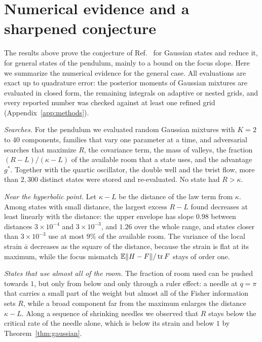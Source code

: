 \section{Numerical evidence and a sharpened conjecture}
\label{sec:evidence}

The results above prove the conjecture of Ref.~\cite{namba2026arrow} for Gaussian states and reduce it, for general states of the pendulum, mainly to a bound on the focus slope. Here we summarize the numerical evidence for the general case. All evaluations are exact up to quadrature error: the posterior moments of Gaussian mixtures are evaluated in closed form, the remaining integrals on adaptive or nested grids, and every reported number was checked against at least one refined grid (Appendix~\ref{app:methods}).

\emph{Searches.} For the pendulum we evaluated random Gaussian mixtures with $K = 2$ to $40$ components, families that vary one parameter at a time, and adversarial searches that maximize $R$, the covariance term, the mass of valleys, the fraction $(R - L)/(\kappa - L)$ of the available room that a state uses, and the advantage $g^*$. Together with the quartic oscillator, the double well and the twist flow, more than $2{,}300$ distinct states were stored and re-evaluated. No state had $R > \kappa$.

\emph{Near the hyperbolic point.} Let $\kappa - L$ be the distance of the law term from $\kappa$. Among states with small distance, the largest excess $R - L$ found decreases at least linearly with the distance: the upper envelope has slope $0.98$ between distances $3\times10^{-4}$ and $3\times10^{-3}$, and $1.26$ over the whole range, and states closer than $3\times10^{-3}$ use at most $9\%$ of the available room. The variance of the local strain $\bar a$ decreases as the square of the distance, because the strain is flat at its maximum, while the focus mismatch $\mathbb{E}\|H - F\|/\operatorname{tr} F$ stays of order one.

\emph{States that use almost all of the room.} The fraction of room used can be pushed towards $1$, but only from below and only through a ruler effect: a needle at $q = \pi$ that carries a small part of the weight but almost all of the Fisher information sets $R$, while a broad component far from the maximum enlarges the distance $\kappa - L$. Along a sequence of shrinking needles we observed that $R$ stays below the critical rate of the needle alone, which is below its strain and below $1$ by Theorem~\ref{thm:gaussian}.

